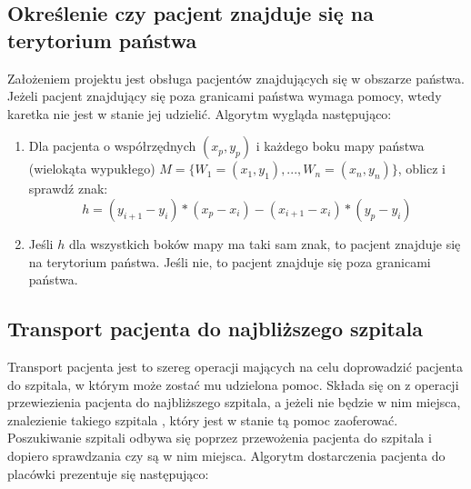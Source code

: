 \documentclass[10pt,a4paper]{article}
\begin{document}
\subsection{Określenie czy pacjent znajduje się na terytorium państwa}

Założeniem projektu jest obsługa pacjentów znajdujących się w obszarze państwa.
Jeżeli pacjent znajdujący się poza granicami państwa wymaga pomocy, wtedy karetka nie jest w stanie jej udzielić.
Algorytm wygląda następująco:

\begin{enumerate}
    \item Dla pacjenta o współrzędnych $(x_p,y_p)$ i każdego boku mapy państwa (wielokąta wypukłego) $M=\{W_1=(x_1,y_1), ..., W_n=(x_n,y_n)\}$, oblicz i sprawdź znak:
    $$h=(y_{i+1}-y_i)*(x_p-x_i)-(x_{i+1}-x_i)*(y_p-y_i)$$
    \item Jeśli $h$ dla wszystkich boków mapy ma taki sam znak, to pacjent znajduje się na terytorium państwa. Jeśli nie, to pacjent znajduje się poza granicami państwa.
\end{enumerate}

\subsection{Transport pacjenta do najbliższego szpitala}

Transport pacjenta jest to szereg operacji mających na celu doprowadzić pacjenta do szpitala, w którym może zostać mu udzielona pomoc.
Składa się on z operacji przewiezienia pacjenta do najbliższego szpitala, a jeżeli nie będzie w nim miejsca, znalezienie takiego szpitala , który jest w stanie tą pomoc zaoferować.
Poszukiwanie szpitali odbywa się poprzez przewożenia pacjenta do szpitala i dopiero sprawdzania czy są w nim miejsca.
Algorytm dostarczenia pacjenta do placówki prezentuje się następująco:
\end{document}

